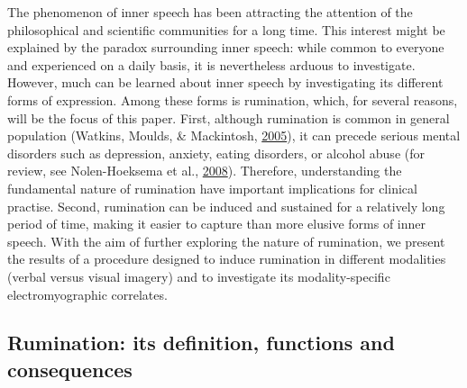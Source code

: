 \documentclass[a4paper,12pt,twoside,openright,oldfontcommands]{memoir}
\begin{document}
The phenomenon of inner speech has been attracting the attention of the philosophical and scientific communities for a long time. This interest might be explained by the paradox surrounding inner speech: while common to everyone and experienced on a daily basis, it is nevertheless arduous to investigate. However, much can be learned about inner speech by investigating its different forms of expression. Among these forms is rumination, which, for several reasons, will be the focus of this paper. First, although rumination is common in general population (Watkins, Moulds, \& Mackintosh, \protect\hyperlink{ref-watkins_comparisons_2005}{2005}), it can precede serious mental disorders such as depression, anxiety, eating disorders, or alcohol abuse (for review, see Nolen-Hoeksema et al., \protect\hyperlink{ref-Nolen-Hoeksema2008}{2008}). Therefore, understanding the fundamental nature of rumination have important implications for clinical practise. Second, rumination can be induced and sustained for a relatively long period of time, making it easier to capture than more elusive forms of inner speech. With the aim of further exploring the nature of rumination, we present the results of a procedure designed to induce rumination in different modalities (verbal versus visual imagery) and to investigate its modality-specific electromyographic correlates.

\hypertarget{rumination-its-definition-functions-and-consequences}{%
\subsection{Rumination: its definition, functions and consequences}\label{rumination-its-definition-functions-and-consequences}}
\end{document}
